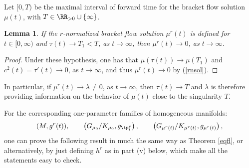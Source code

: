 \documentclass[11pt]{amsart}
\theoremstyle{plain}
\newtheorem{lemma}[theorem]{Lemma}
\theoremstyle{definition}
\theoremstyle{remark}
\begin{document}
Let $[0,T)$ be the maximal interval of forward time for the bracket flow solution $\mu(t)$, with $T\in\RR_{>0}\cup\{\infty\}$.

\begin{lemma}\label{maxtime}
If the $r$-normalized bracket flow solution $\mu^r(t)$ is defined for $t\in[0,\infty)$ and $\tau(t)\to T_1<T$, as $t\to\infty$, then $\mu^r(t)\to 0$, as $t\to\infty$.
\end{lemma}

\begin{proof}
Under these hypothesis, one has that $\mu(\tau(t))\to\mu(T_1)$ and $c^2(t)=\tau'(t)\to 0$, as $t\to\infty$, and thus $\mu^r(t)\to 0$ by (\ref{rnsol}).
\end{proof}

In particular, if $\mu^r(t)\to\lambda\ne 0$, as $t\to\infty$, then $\tau(t)\to T$ and $\lambda$ is therefore providing information on the behavior of $\mu(t)$ close to the singularity $T$.

For the corresponding one-parameter families of homogeneous manifolds:
\begin{equation}\label{3rmrn}
(M,g^r(t)), \qquad \left(G_{\mu_0}/K_{\mu_0},g_{\ip^r_t}\right), \qquad \left(G_{\mu^r(t)}/K_{\mu^r(t)},g_{\mu^r(t)}\right),
\end{equation}
one can prove the following result in much the same way as Theorem \ref{eqfl}, or alternatively, by just defining $h^r$ as in part (v) below, which make all the statements easy to check.
\end{document}
